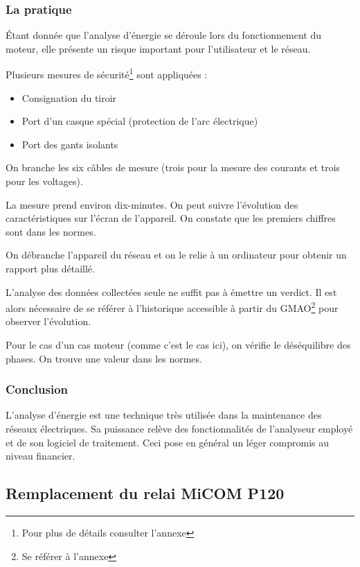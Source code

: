 \subsubsection{La pratique}

Étant donnée que l'analyse d'énergie se déroule lors du fonctionnement du moteur, elle  présente un risque important pour l'utilisateur et le réseau.

Plusieurs mesures de sécurité\footnote{Pour plus de détails consulter l'annexe \uppercase\expandafter{}} sont appliquées :

\begin{itemize}
\item Consignation du tiroir 
\item Port d'un casque spécial (protection de l'arc électrique)
\item Port des gants isolants

\end{itemize}

On branche les six câbles de mesure (trois pour la mesure des courants et trois pour les voltages). 

La mesure prend environ dix-minutes. On peut suivre l'évolution des caractéristiques sur l'écran de l'appareil. On constate que les premiers chiffres sont dans les normes.

On débranche l'appareil du réseau et on le relie à un ordinateur pour obtenir un rapport plus détaillé.

L'analyse  des données collectées seule ne suffit pas à émettre un verdict. Il est alors nécessaire  de se référer à l'historique accessible à partir du GMAO\footnote{Se référer à l'annexe \uppercase\expandafter{} } pour observer l'évolution. 

Pour le cas d'un cas moteur (comme c'est le cas ici), on vérifie le déséquilibre des phases. On trouve une valeur dans les normes.
 
\subsubsection{Conclusion}
L'analyse d'énergie est une technique très utilisée dans la maintenance des réseaux électriques. Sa puissance relève des fonctionnalités de  l'analyseur employé et de son logiciel de traitement. Ceci  pose en général un léger compromis au niveau financier. %

\subsection{Remplacement du relai MiCOM P120}
